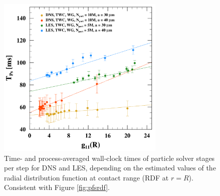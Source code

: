 \begin{figure}
\centering
\includegraphics[width=8cm]{figures/3-14_pffrdfps.pdf}
\caption{
Time- and process-averaged wall-clock times of particle solver stages per step for DNS and LES, depending on the estimated values of the radial distribution function at contact range (RDF at $r=R$).
Consistent with Figure \ref{fig:pfsrdf}.
}
\label{fig:pffrdfps}
\end{figure}
    


